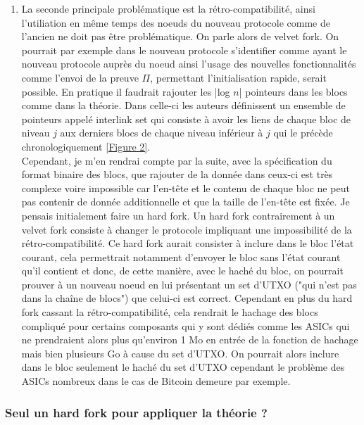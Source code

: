 \documentclass[12pt,a4paper]{article}
\newcommand{\annexe}[2]{\hyperlink{#1}{[Figure #2]}}
\begin{document}
\begin{enumerate}
	\item La seconde principale problématique est la rétro-compatibilité, ainsi l'utiliation en même temps des noeuds du nouveau protocole comme de l'ancien ne doit pas être problématique. On parle alors de velvet fork. On pourrait par exemple dans le nouveau protocole s'identifier comme ayant le nouveau protocole auprès du noeud ainsi l'usage des nouvelles fonctionnalités comme l'envoi de la preuve $\Pi$, permettant l'initialisation rapide, serait possible. En pratique il faudrait rajouter les |log $n$| pointeurs dans les blocs comme dans la théorie. Dans celle-ci les auteurs définissent un ensemble de pointeurs appelé interlink set qui consiste à avoir les liens de chaque bloc de niveau $j$ aux derniers blocs de chaque niveau inférieur à $j$ qui le précède chronologiquement \annexe{22}{2}.\\ %
	Cependant, je m'en rendrai compte par la suite, avec la spécification du format binaire des blocs, que rajouter de la donnée dans ceux-ci est très complexe voire impossible car l'en-tête et le contenu de chaque bloc ne peut pas contenir de donnée additionnelle et que la taille de l'en-tête est fixée. Je pensais initialement faire un hard fork. Un hard fork contrairement à un velvet fork consiste à changer le protocole impliquant une impossibilité de la rétro-compatibilité. Ce hard fork aurait consister à inclure dans le bloc l'état courant, cela permettrait notamment d'envoyer le bloc sans l'état courant qu'il contient et donc, de cette manière, avec le haché du bloc, on pourrait prouver à un nouveau noeud en lui présentant un set d'UTXO ("qui n'est pas dans la chaîne de blocs") que celui-ci est correct. Cependant en plus du hard fork cassant la rétro-compatibilité, cela rendrait le hachage des blocs compliqué pour certains composants qui y sont dédiés comme les ASICs qui ne prendraient alors plus qu'environ 1 Mo en entrée de la fonction de hachage mais bien plusieurs Go à cause du set d'UTXO. %
	On pourrait alors inclure dans le bloc seulement le haché du set d'UTXO cependant le problème des ASICs nombreux dans le cas de Bitcoin demeure par exemple.
	\end{enumerate}
	
	\subsubsection{Seul un hard fork pour appliquer la théorie ?}
	
\end{document}
